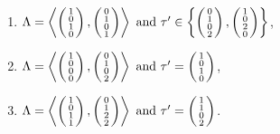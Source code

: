 \begin{prop}
\begin{enumerate}
\item
$\Lambda=\plan{1\\0\\1\\0}{0\\1\\0\\1} \text{ and } \tau' \in \left\{ \vect{0\\1\\0\\2},\vect{1\\0\\2\\0} \right\}$,

\item
$\Lambda=\plan{1\\0\\0\\0}{0\\1\\0\\2} \text{ and } \tau' = \vect{1\\0\\1\\0}$,

\item
$\Lambda=\plan{1\\0\\1\\1}{0\\1\\2\\2} \text{ and } \tau' = \vect{1\\1\\0\\2}$.
\end{enumerate}
\end{prop}

